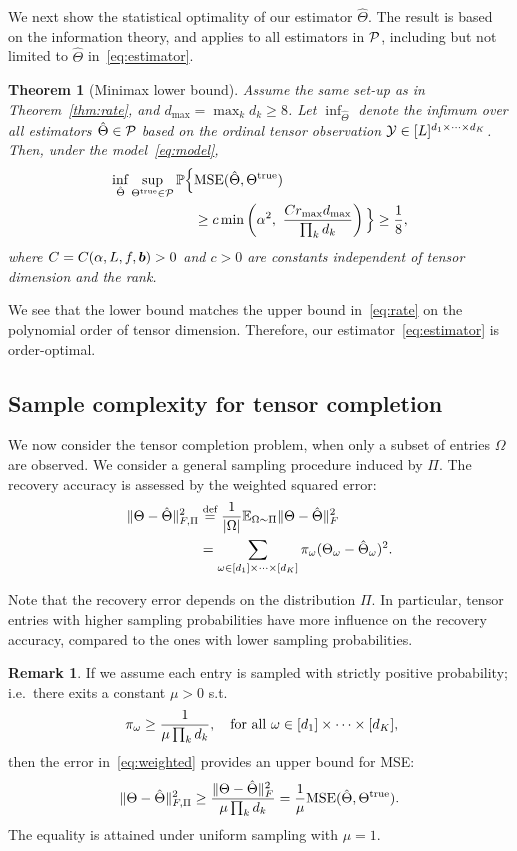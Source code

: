 \documentclass{article}
\theoremstyle{plain}
\newtheorem{thm}{Theorem}[section]
\theoremstyle{definition}
\newtheorem{rmk}{Remark}
\begin{document}
We next show the statistical optimality of our estimator $\hat \Theta$. The result is based on the information theory, and applies to all estimators in $\mathcal{P}$, including but not limited to $\hat \Theta$ in~\eqref{eq:estimator}.

\begin{thm}[Minimax lower bound]\label{thm:minimax}
Assume the same set-up as in Theorem~\ref{thm:rate}, and $d_{\max}=\max_k d_k \geq 8$. Let $\inf_{\hat \Theta}$ denote the infimum over all estimators $\hat \Theta\in\mathcal{P}$ based on the ordinal tensor observation $\mathcal{Y}\in[L]^{d_1\times \cdots \times d_K}$. Then, under the model~\eqref{eq:model},
\begin{align}\label{eq:lower}
\inf_{\hat \Theta }\sup_{\Theta^{\text{true}}\in\mathcal{P}} \mathbb{P}\Big\{& \text{MSE}(\hat \Theta, \Theta^{\text{true}}) \\
& \geq c\min\left( \alpha^2, \ { Cr_{\max}d_{\max} \over \prod_k d_k} \right) \Big\} \geq {1\over 8},
\end{align}
where $C=C(\alpha, L, f,\bm{b})>0$ and $c>0$ are constants independent of tensor dimension and the rank.
\end{thm}
We see that the lower bound matches the upper bound in~\eqref{eq:rate} on the polynomial order of tensor dimension. Therefore, our estimator~\eqref{eq:estimator} is order-optimal.

\subsection{Sample complexity for tensor completion}
We now consider the tensor completion problem, when only a subset of entries $\Omega$ are observed. We consider a general sampling procedure induced by $\Pi$. The recovery accuracy is assessed by the weighted squared error:
\begin{align}\label{eq:weighted}
\lVert\Theta-\hat \Theta\rVert_{F,\Pi}^2&\stackrel{\text{def}}{=}
{1\over |\Omega|}\mathbb{E}_{\Omega\sim \Pi}\lVert\Theta-\hat \Theta\rVert_F^2\notag \\
&=\sum_{\omega\in[d_1]\times \cdots \times [d_K]} \pi_{\omega}(\Theta_{\omega}-\hat \Theta_{\omega})^2.
\end{align}

Note that the recovery error depends on the distribution $\Pi$. In particular, tensor entries with higher sampling probabilities have more influence on the recovery accuracy, compared to the ones with lower sampling probabilities.
\begin{rmk} If we assume each entry is sampled with strictly positive probability; i.e.\ there exits a constant $\mu> 0$ s.t.
\[
\ \pi_\omega\geq {1\over \mu \prod_k d_k},\quad \text{for all}\ \omega\in[d_1]\times\cdots \times [d_K],
\]
then the error in~\eqref{eq:weighted} provides an upper bound for MSE:
\[
\lVert\Theta-\hat \Theta\rVert_{F,\Pi}^2 \geq {\lVert\Theta-\hat \Theta\rVert_F^2\over \mu \prod_kd_k}={1\over \mu}\text{MSE}(\hat \Theta, \Theta^{\text{true}}).
\]
The equality is attained under uniform sampling with $\mu=1$.
\end{rmk}
\end{document}
